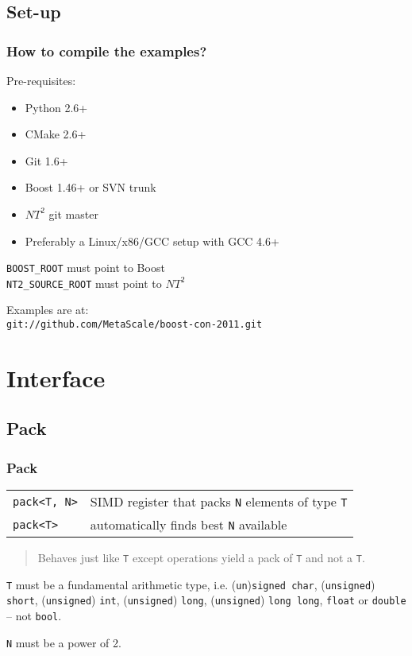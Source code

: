 \documentclass{beamer}
\begin{document}
\subsection{Set-up}
\begin{frame}
	\frametitle{How to compile the examples?}	
	
	Pre-requisites:
	\begin{itemize}
		\item Python 2.6+
		\item CMake 2.6+
		\item Git 1.6+
		\item Boost 1.46+ or SVN trunk
		\item $NT^2$ git master
		\item Preferably a Linux/x86/GCC setup with GCC 4.6+
	\end{itemize}
	\bigskip
	
	\texttt{BOOST\_ROOT} must point to Boost\\
	\texttt{NT2\_SOURCE\_ROOT} must point to $NT^2$
	\bigskip
	
	Examples are at:\\
	\texttt{git://github.com/MetaScale/boost-con-2011.git}
	
\end{frame}


\section{Interface}
\subsection{Pack}

\begin{frame}
	\frametitle{Pack}
	
	\begin{tabular}{ll}
	\lstinline{pack<T, N>} & SIMD register that packs \lstinline{N} elements of type \lstinline{T}\\
	\lstinline{pack<T>} & automatically finds best \lstinline{N} available
	\end{tabular}
	\bigskip	
	
	\begin{quote} Behaves just like \lstinline{T} except operations yield a pack of \lstinline{T} and not a \lstinline{T}. \end{quote}
	\bigskip	
	
	\lstinline{T} must be a fundamental arithmetic type, i.e. (\lstinline{un})\lstinline{signed char}, (\lstinline{unsigned}) \lstinline{short}, (\lstinline{unsigned}) \lstinline{int}, (\lstinline{unsigned}) \lstinline{long}, (\lstinline{unsigned}) \lstinline{long long}, \lstinline{float} or \lstinline{double} -- not \lstinline{bool}.
	\bigskip
	
	\lstinline{N} must be a power of 2.
	
\end{frame}
\end{document}

